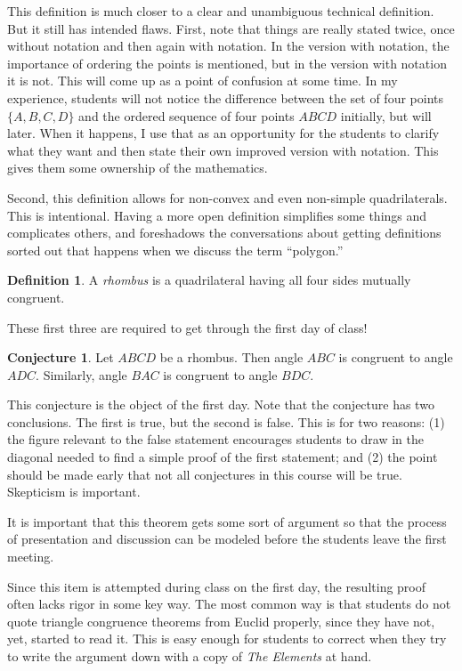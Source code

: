 \documentclass{tufte-handout}
\theoremstyle{definition}
\newtheorem{conjecture}[problem]{Conjecture}
\newtheorem*{definition}{Definition}
\begin{document}
This definition is much closer to a clear and unambiguous technical definition. But it still has intended flaws. 
First, note that things are really stated twice, once without notation and then again with notation. 
In the version with notation, the importance of ordering the points is mentioned, but in the version with notation it is not. 
This will come up as a point of confusion at some time. 
In my experience, students will not notice the difference between the set of four points $\{A, B, C, D\}$ and the ordered sequence of four points $ABCD$ initially, but will later. 
When it happens, I use that as an opportunity for the students to clarify what they want and then state their own improved version with notation. 
This gives them some ownership of the mathematics.

Second, this definition allows for non-convex and even non-simple quadrilaterals. This is intentional. Having a more open definition simplifies some things and complicates others, and foreshadows the conversations about getting definitions sorted out that happens when we discuss the term ``polygon.''


\begin{definition}\label{defn:rhombus}
A \emph{rhombus} is a quadrilateral having all four sides mutually congruent.
\end{definition}

These first three are required to get through the first day of class! 


\begin{conjecture}
\label{conj:rhombus-angles}
Let $ABCD$ be a rhombus. Then angle $ABC$ is congruent to angle $ADC$. Similarly, angle $BAC$ is congruent to angle $BDC$.
\end{conjecture}

This conjecture is the object of the first day.
Note that the conjecture has two conclusions.
The first is true, but the second is false.
This is for two reasons:
(1) the figure relevant to the false statement encourages students to draw in the diagonal needed to find a simple proof of the first statement; and
(2) the point should be made early that not all conjectures in this course will be true.
Skepticism is important.

It is important that this theorem gets some sort of argument so that the process of presentation and discussion can be modeled before the students leave the first meeting.

Since this item is attempted during class on the first day, the resulting proof often lacks rigor in some key way. The most common way is that students do not quote triangle congruence theorems from Euclid properly, since they have not, yet, started to read it. This is easy enough for students to correct when they try to write the argument down with a copy of \emph{The Elements} at hand. 
\end{document}
